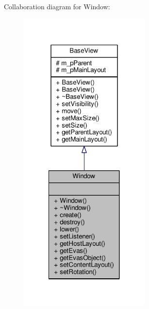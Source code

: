 Collaboration diagram for Window\-:
\nopagebreak
\begin{figure}[H]
\begin{center}
\leavevmode
\includegraphics[width=188pt]{class_window__coll__graph}
\end{center}
\end{figure}
